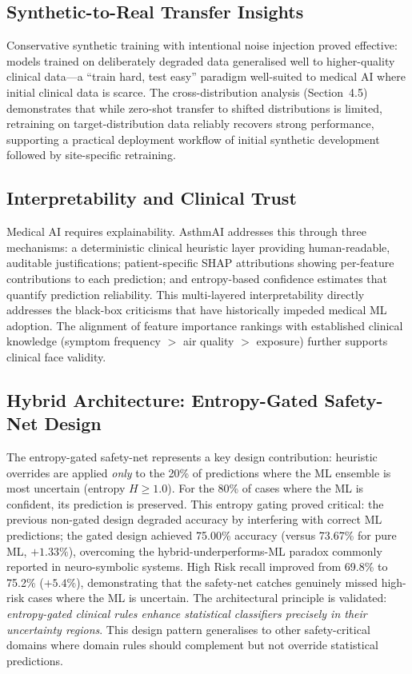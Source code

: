 \documentclass[11pt,a4paper]{article}
\begin{document}
\subsection{Synthetic-to-Real Transfer Insights}

Conservative synthetic training with intentional noise injection proved effective:
models trained on deliberately degraded data generalised well to higher-quality clinical
data---a ``train hard, test easy'' paradigm well-suited to medical AI where initial
clinical data is scarce. The cross-distribution analysis (Section~4.5) demonstrates
that while zero-shot transfer to shifted distributions is limited, retraining on
target-distribution data reliably recovers strong performance, supporting a practical
deployment workflow of initial synthetic development followed by site-specific
retraining.

\subsection{Interpretability and Clinical Trust}

Medical AI requires explainability. AsthmAI addresses this through three mechanisms:
a deterministic clinical heuristic layer providing human-readable, auditable
justifications; patient-specific SHAP \cite{lundberg2017} attributions showing
per-feature contributions to each prediction; and entropy-based confidence estimates
that quantify prediction reliability. This multi-layered interpretability directly
addresses the black-box criticisms that have historically impeded medical ML adoption.
The alignment of feature importance rankings with established clinical knowledge
(symptom frequency $>$ air quality $>$ exposure) further supports clinical face
validity.

\subsection{Hybrid Architecture: Entropy-Gated Safety-Net Design}

The entropy-gated safety-net represents a key design contribution: heuristic
overrides are applied \emph{only} to the 20\% of predictions where the ML ensemble
is most uncertain (entropy $H \geq 1.0$). For the 80\% of cases where the ML is
confident, its prediction is preserved. This entropy gating proved critical: the
previous non-gated design degraded accuracy by interfering with correct ML predictions;
the gated design achieved 75.00\% accuracy (versus 73.67\% for pure ML, $+1.33\%$),
overcoming the hybrid-underperforms-ML paradox commonly reported in neuro-symbolic
systems. High Risk recall improved from 69.8\% to 75.2\% ($+5.4\%$),
demonstrating that the safety-net catches genuinely missed high-risk cases where
the ML is uncertain. The architectural principle is validated:
\emph{entropy-gated clinical rules enhance statistical classifiers precisely in
their uncertainty regions}. This design pattern generalises to other
safety-critical domains where domain rules should complement but not override
statistical predictions.
\end{document}
